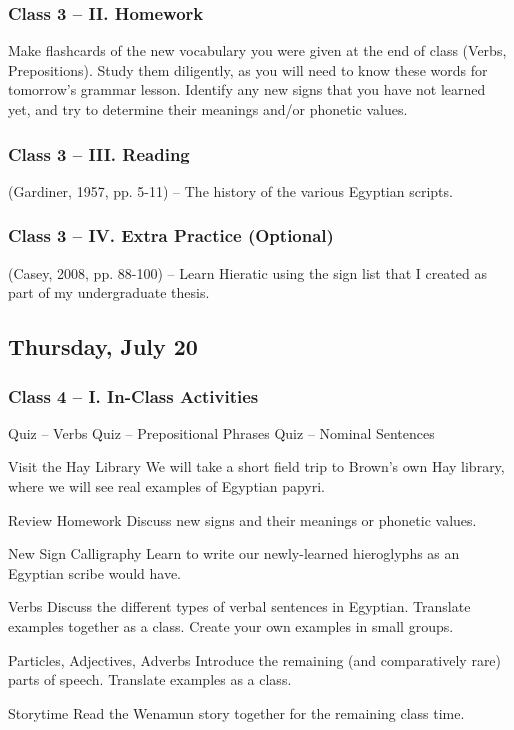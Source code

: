 \documentclass[11pt]{article}
\begin{document}
		\subsubsection*{Class 3 -- II. Homework}
			Make flashcards of the new vocabulary you were given at the end of class (Verbs, Prepositions).
			Study them diligently, as you will need to know these words for tomorrow's grammar lesson.
			Identify any new signs that you have not learned yet, and try to determine their meanings and/or phonetic values.
			
		\subsubsection*{Class 3 -- III. Reading}
			(Gardiner, 1957, pp. 5-11) -- The history of the various Egyptian scripts.
			
		\subsubsection*{Class 3 -- IV. Extra Practice (Optional)}
			(Casey, 2008, pp. 88-100) -- Learn Hieratic using the sign list that I created as part of my undergraduate thesis.
			
	\subsection*{Thursday, July 20}
		\subsubsection*{Class 4 -- I. In-Class Activities}
			\begin{outline}[itemize]
				\1 Quiz -- Verbs
				\1 Quiz -- Prepositional Phrases
				\1 Quiz -- Nominal Sentences
				
				\1 Visit the Hay Library
					\2 We will take a short field trip to Brown's own Hay library, 
						where we will see real examples of Egyptian papyri.
				
				\1 Review Homework
					\2 Discuss new signs and their meanings or phonetic values.
				
				\1 New Sign Calligraphy
					\2 Learn to write our newly-learned hieroglyphs as an Egyptian scribe would have.
					
				\1 Verbs
					\2 Discuss the different types of verbal sentences in Egyptian.
					\2 Translate examples together as a class.
					\2 Create your own examples in small groups.
				
				\1 Particles, Adjectives, Adverbs
					\2 Introduce the remaining (and comparatively rare) parts of speech.
					\2 Translate examples as a class.
					
				\1 Storytime
					\2 Read the Wenamun story together for the remaining class time.
				
				
			\end{outline}
			
\end{document}
